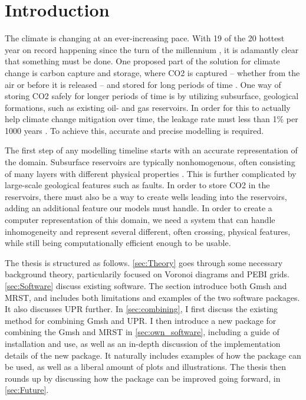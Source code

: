 \section{Introduction}
The climate is changing at an ever-increasing pace. With 19 of the 20 hottest year on record happening since the turn of the millennium \cite{NASA-climate}, it is adamantly clear that something must be done. One proposed part of the solution for climate change is carbon capture and storage, where CO2 is captured -- whether from the air or before it is released -- and stored for long periods of time \cite{climate-mitigation}. One way of storing CO2 safely for longer periods of time is by utilizing subsurface, geological formations, such as existing oil- and gas reservoirs. In order for this to actually help climate change mitigation over time, the leakage rate must less than 1\% per 1000 years \cite{Shaffer-CO2-capture}. To achieve this, accurate and precise modelling is required.

The first step of any modelling timeline starts with an accurate representation of the domain. Subsurface reservoirs are typically nonhomogenous, often consisting of many layers with different physical properties \cite{UPR_thesis}. This is further complicated by large-scale geological features such as faults. In order to store CO2 in the reservoirs, there must also be a way to create wells leading into the reservoirs, adding an additional feature our models must handle. In order to create a computer representation of this domain, we need a system that can handle inhomogeneity and represent several different, often crossing, physical features, while still being computationally efficient enough to be usable.


The thesis is structured as follows. \autoref{sec:Theory} goes through some necessary background theory, particularily focused on Voronoi diagrams and PEBI grids. \autoref{sec:Software} discuss existing software. The section introduce both Gmsh and MRST, and includes both limitations and examples of the two software packages. It also discusses UPR further. In \autoref{sec:combining}, I first discuss the existing method for combining Gmsh and UPR. I then introduce a new package for combining the Gmsh and MRST in \autoref{sec:own_software}, including a guide of installation and use, as well as an in-depth discussion of the implementation details of the new package. It naturally includes examples of how the package can be used, as well as a liberal amount of plots and illustrations. The thesis then rounds up by discussing how the package can be improved going forward, in \autoref{sec:Future}.